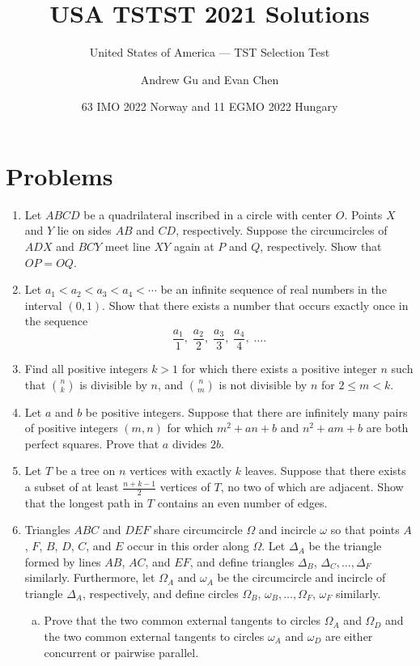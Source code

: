\documentclass[11pt]{scrartcl}
\begin{document}
\title{USA TSTST 2021 Solutions}
\subtitle{United States of America --- TST Selection Test}
\author{Andrew Gu and Evan Chen}
\date{63 IMO 2022 Norway and 11 EGMO 2022 Hungary}

\maketitle

\tableofcontents
\newpage

\addtocounter{section}{-1}
\section{Problems}
\begin{enumerate}[\bfseries 1.]
\item %
Let $ABCD$ be a quadrilateral inscribed in a circle with center $O$.
Points $X$ and $Y$ lie on sides $AB$ and $CD$, respectively.
Suppose the circumcircles of $ADX$ and $BCY$
meet line $XY$ again at $P$ and $Q$, respectively.
Show that $OP=OQ$.

\item %
Let $a_1 < a_2 < a_3 < a_4 < \dotsb$ be an
infinite sequence of real numbers in the interval $(0,1)$.
Show that there exists a number that occurs
exactly once in the sequence
\[ \frac{a_1}{1}, \; \frac{a_2}{2}, \;
  \frac{a_3}{3}, \; \frac{a_4}{4}, \; \dots. \]

\item %
Find all positive integers $k > 1$ for which there exists a positive integer
$n$ such that $\binom{n}{k}$ is divisible by $n$, and $\binom{n}{m}$ is not
divisible by $n$ for $2\leq m < k$.

\item %
Let $a$ and $b$ be positive integers.
Suppose that there are infinitely many pairs of positive integers $(m, n)$
for which $m^2+an+b$ and $n^2+am+b$ are both perfect squares.
Prove that $a$ divides $2b$.

\item %
Let $T$ be a tree on $n$ vertices with exactly $k$ leaves.
Suppose that there exists a subset of
at least $\frac{n+k-1}{2}$ vertices of $T$,
no two of which are adjacent.
Show that the longest path in $T$ contains
an even number of edges.

\item %
Triangles $ABC$ and $DEF$ share circumcircle $\Omega$ and incircle $\omega$
so that points $A$, $F$, $B$, $D$, $C$, and $E$ occur in this order along $\Omega$.
Let $\Delta_A$ be the triangle formed by lines $AB$, $AC$, and $EF$,
and define triangles $\Delta_B$, $\Delta_C, \dots, \Delta_F$ similarly.
Furthermore, let $\Omega_A$ and $\omega_A$ be the circumcircle and incircle
of triangle $\Delta_A$, respectively, and define circles
$\Omega_B$, $\omega_B, \dots, \Omega_F$, $\omega_F$ similarly.
\begin{enumerate}[(a)]
  \item Prove that the two common external tangents to circles $\Omega_A$ and $\Omega_D$
    and the two common external tangents to circles $\omega_A$ and $\omega_D$
    are either concurrent or pairwise parallel.


\end{enumerate}
\end{enumerate}
\end{document}
